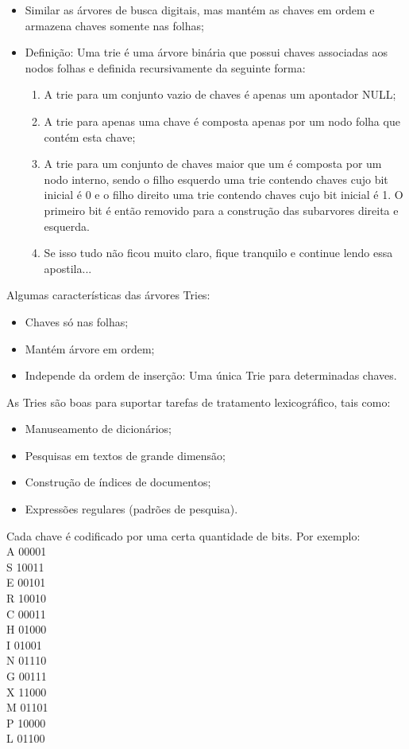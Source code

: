 \documentclass{article}
\begin{document}
\begin{itemize}
   \item Similar as árvores de busca digitais, mas mantém as chaves em ordem e armazena chaves
somente nas folhas;
   \item Definição: Uma trie é uma árvore binária que possui chaves associadas aos nodos folhas e definida recursivamente da seguinte forma:
      \begin{enumerate}
         \item A trie para um conjunto vazio de chaves é apenas um apontador NULL;
         \item A trie para apenas uma chave é composta apenas por um nodo folha que contém esta
chave;
         \item A trie para um conjunto de chaves maior que um é composta por um nodo interno, sendo
o filho esquerdo uma trie contendo chaves  cujo bit inicial é 0 e o filho direito uma trie contendo
chaves cujo bit inicial é 1. O primeiro bit é então removido para a construção das subarvores direita e esquerda.
         \item Se isso tudo não ficou muito claro, fique tranquilo e continue lendo essa
apostila...
      \end{enumerate}
\end{itemize}

Algumas características das árvores Tries:

\begin{itemize}
   \item Chaves só nas folhas;
   \item Mantém árvore em ordem;
   \item Independe da ordem de inserção: Uma única Trie para determinadas chaves.
\end{itemize}

As Tries são boas para suportar tarefas de tratamento
lexicográfico, tais como:

\begin{itemize}
   \item Manuseamento de dicionários;
   \item Pesquisas em textos de grande dimensão;
   \item Construção de índices de documentos;
   \item Expressões regulares (padrões de pesquisa).
\end{itemize}

Cada chave é codificado por uma certa quantidade de bits. Por exemplo:\\
A 00001\\
S 10011\\
E 00101\\
R 10010\\
C 00011\\
H 01000\\
I 01001\\
N 01110\\
G 00111\\
X 11000\\
M 01101\\
P 10000\\
L 01100\\
\end{document}
